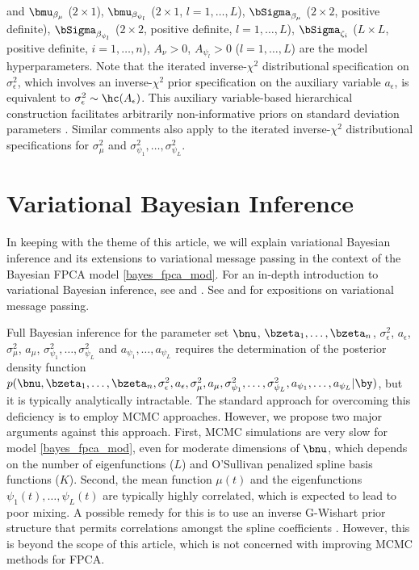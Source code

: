\documentclass[12pt]{article}
\def\sigsqeps{\sigma^2_{\epsilon}}
\def\aeps{a_{\epsilon}}
\def\sigsqmu{\sigma^2_{\mu}}
\def\amu{a_{\mu}}
\newcommand\sigsqpsi[1]{\sigma^2_{\psi_{#1}}}
\newcommand\apsi[1]{a_{\psi_{#1}}}
\theoremstyle{plain}
\theoremstyle{definition}
\theoremstyle{remark}
\begin{document}
\noindent and $\bmu_{\beta_\mu}$ ($2 \times 1$), $\bmu_{\beta_{\psi_l}}$ ($2 \times 1$, $l = 1, \dots, L$),
$\bSigma_{\beta_\mu}$ ($2 \times 2$, positive definite), $\bSigma_{\beta_{\psi_l}}$ ($2 \times 2$, positive definite,
$l = 1, \dots, L$), $\bSigma_{\zeta_i}$ ($L \times L$, positive definite, $i = 1, \dots, n$), $A_\nu > 0$,
$A_{\psi_l} > 0$ ($l = 1, \dots, L$) are the model hyperparameters.
Note that the iterated inverse-$\chi^2$ distributional specification on $\sigsqeps$,
which involves an inverse-$\chi^2$ prior specification on the auxiliary variable $\aeps$, is equivalent to $\sigsqeps \sim
\hc (A_{\epsilon})$. This auxiliary variable-based hierarchical construction facilitates arbitrarily non-informative
priors on standard deviation parameters \cite{gelman06}. Similar comments also apply to the iterated inverse-$\chi^2$
distributional specifications for $\sigsqmu$ and $\sigsqpsi{1}, \dots, \sigsqpsi{L}$.


\section{Variational Bayesian Inference}
\label{sec:vbi}

In keeping with the theme of this article, we will explain variational Bayesian inference and its extensions to
variational message passing in the context of the Bayesian FPCA model \eqref{bayes_fpca_mod}. For an
in-depth introduction to variational Bayesian inference, see  and . See 
and  for expositions on variational message passing.

Full Bayesian inference for the parameter set $\bnu$, $\bzeta_1, \dots, \bzeta_n$, $\sigsqeps$, $\aeps$,
$\sigsqmu$, $\amu$, $\sigsqpsi{1}, \dots, \sigsqpsi{L}$ and $\apsi{1}, \dots, \apsi{L}$ requires the determination
of the posterior density function $p (\bnu, \bzeta_1, \dots, \bzeta_n,\allowbreak
\sigsqeps, \aeps, \sigsqmu, \amu,
\sigsqpsi{1}, \dots, \sigsqpsi{L}, \apsi{1}, \dots, \apsi{L} | \by)$, but it is typically analytically intractable.
The standard approach for overcoming this deficiency is to
employ MCMC approaches. However, we propose two major arguments against this approach. First, MCMC
simulations are very slow for model \eqref{bayes_fpca_mod}, even for moderate dimensions of $\bnu$, which
depends on the number of eigenfunctions ($L$) and O'Sullivan penalized spline basis functions ($K$).
Second, the mean function $\mu (t)$ and the eigenfunctions $\psi_1 (t), \dots,
\psi_L (t)$ are typically highly correlated, which is expected to lead to poor mixing.
A possible remedy for this is to use an inverse G-Wishart prior structure that permits
correlations amongst the spline coefficients \cite{goldsmith16}. However, this is beyond the scope of this article,
which is not concerned with improving MCMC methods for FPCA.
\end{document}

